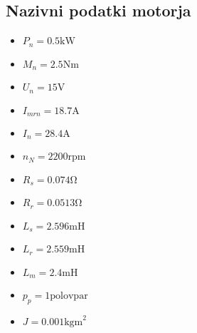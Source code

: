 \documentclass[journal,a4paper,twoside]{sty/IEEEtran}
\begin{document}
\subsection{Nazivni podatki motorja}
\begin{itemize}
\item{$P_n=0.5 \mathrm{ kW}$}
\item{$M_n = 2.5 \mathrm{ Nm}$}
\item{$U_n = 15 \mathrm{ V}$}	
\item{$I_{mrn} = 18.7 \mathrm{ A}$}
\item{$I_n = 28.4 \mathrm{ A}$}
\item{$n_N = 2200 \mathrm{ rpm}$}
\item{$R_s = 0.074\mathrm{ \Omega}$}
\item{$R_r = 0.0513\mathrm{ \Omega}$}
\item{$L_s = 2.596\mathrm{ mH}$}
\item{$L_r = 2.559\mathrm{ mH}$}
\item{$L_m = 2.4 \mathrm{ mH}$}
\item{$p_p = 1 \mathrm{ polov par}$}
\item{$J = 0.001 \mathrm{ kg m}^2$}
\end{itemize}
%
%
%
%
%
%
\end{document}
